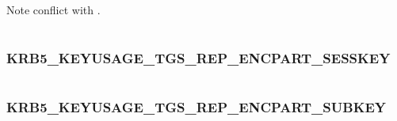 \documentclass[letterpaper,10pt,english]{sphinxmanual}
\begin{document}
\begin{fulllineitems}
\label{appdev/refs/macros/KRB5_KEYUSAGE_PA_SAM_RESPONSE:KRB5_KEYUSAGE_PA_SAM_RESPONSE}
\end{fulllineitems}


Note conflict with  .

\begin{tabulary}{\linewidth}{|L|L|}
\hline

 & 
\\
\hline\end{tabulary}



\subsubsection{KRB5\_KEYUSAGE\_TGS\_REP\_ENCPART\_SESSKEY}
\label{appdev/refs/macros/KRB5_KEYUSAGE_TGS_REP_ENCPART_SESSKEY:krb5-keyusage-tgs-rep-encpart-sesskey}\label{appdev/refs/macros/KRB5_KEYUSAGE_TGS_REP_ENCPART_SESSKEY:krb5-keyusage-tgs-rep-encpart-sesskey-data}\label{appdev/refs/macros/KRB5_KEYUSAGE_TGS_REP_ENCPART_SESSKEY::doc}

\begin{fulllineitems}
\label{appdev/refs/macros/KRB5_KEYUSAGE_TGS_REP_ENCPART_SESSKEY:KRB5_KEYUSAGE_TGS_REP_ENCPART_SESSKEY}
\end{fulllineitems}


\begin{tabulary}{\linewidth}{|L|L|}
\hline

 & 
\\
\hline\end{tabulary}



\subsubsection{KRB5\_KEYUSAGE\_TGS\_REP\_ENCPART\_SUBKEY}
\label{appdev/refs/macros/KRB5_KEYUSAGE_TGS_REP_ENCPART_SUBKEY:krb5-keyusage-tgs-rep-encpart-subkey-data}\label{appdev/refs/macros/KRB5_KEYUSAGE_TGS_REP_ENCPART_SUBKEY::doc}\label{appdev/refs/macros/KRB5_KEYUSAGE_TGS_REP_ENCPART_SUBKEY:krb5-keyusage-tgs-rep-encpart-subkey}
\end{document}
